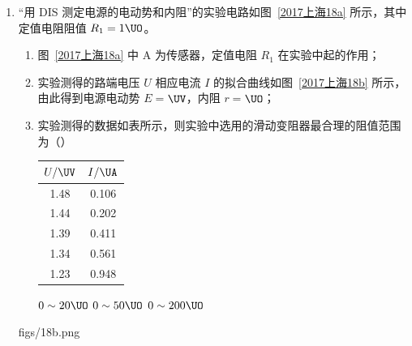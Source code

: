 \documentclass[\gkver]{gaokaozhenti}
\begin{document}
\begin{enumerate}
\item
“用 DIS 测定电源的电动势和内阻”的实验电路如图~\ref{2017上海18a} 所示，其中定值电阻阻值 $R_{1} = 1\UO$。
\begin{enumerate}
	\item
	图~\ref{2017上海18a} 中 A 为传感器，定值电阻 $R_{1}$ 在实验中起的作用；
	\item
	实验测得的路端电压 $U$ 相应电流 $I$ 的拟合曲线如图~\ref{2017上海18b} 所示，由此得到电源电动势 $E =$$\UV$，内阻 $r =$$\UO$；
	\item
	实验测得的数据如表所示，则实验中选用的滑动变阻器最合理的阻值范围为（\quad）

	\begin{center}
	\begin{tabular}{|c|c|}
	\hline
	$U/\UV$ & $I/\UA$ \\ \hline
	1.48 & 0.106 \\ \hline
	1.44 & 0.202 \\ \hline
	1.39 & 0.411 \\ \hline
	1.34 & 0.561 \\ \hline
	1.23 & 0.948 \\ \hline
	\end{tabular}
	\end{center}

	{$0\sim20\UO$}
	{$0\sim50\UO$}
	{$0\sim200\UO$}
\end{enumerate}
{figs/18b.png}


\end{enumerate}
\end{document}
